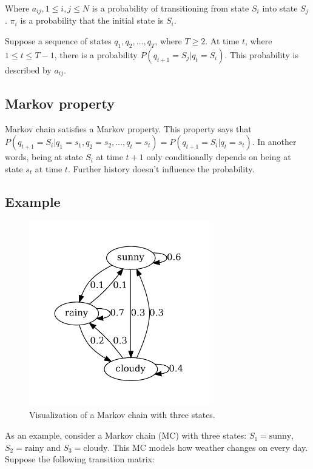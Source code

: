 \documentclass[thesis=B,english]{FITthesis}[2012/06/26]
\begin{document}
Where $a_{ij}, 1 \leq i,j \leq N$ is a probability of transitioning from state $S_i$ into state $S_j$. $\pi_i$ is a probability that the initial state is $S_i$.

Suppose a sequence of states $q_1, q_2, \dots, q_T$, where $T \geq 2$. At time $t$, where $1 \leq t \leq T-1$, there is a probability $P(q_{t+1}=S_j | q_t=S_i)$. This probability is described by $a_{ij}$.

\subsection{Markov property}
Markov chain satisfies a Markov property. This property says that $P(q_{t+1}=S_i|q_1=s_1,q_2=s_2,\dots,q_t=s_t) = P(q_{t+1}=S_{i}|q_t=s_t)$. In another words, being at state $S_i$ at time $t+1$ only conditionally depends on being at state $s_t$ at time $t$. Further history doesn't influence the probability.

\subsection{Example}

\begin{figure}
	\centering
 	\includegraphics[width=0.7\textwidth]{mc}
 	\caption{Visualization of a Markov chain with three states.}
 	\label{fig:mc}
\end{figure}

As an example, consider a Markov chain (MC) with three states: $S_1 = \text{sunny}$, $S_2 = \text{rainy}$ and $S_3 = \text{cloudy}$. This MC models how weather changes on every day. Suppose the following transition matrix:
\end{document}

